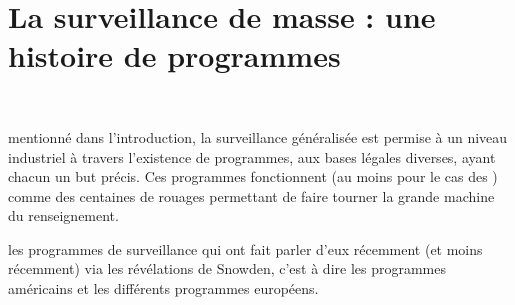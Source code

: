 
\chapter{La surveillance de masse : une histoire de programmes}
\label{ch:programmes}

~\vfill
\begin{doublespace}
\noindent\fontsize{18}{22}\selectfont\itshape
\nohyphenation
{}
\end{doublespace}
\vfill
\vfill

 mentionné dans l'introduction, la surveillance
généralisée est permise à un niveau industriel à travers l'existence de
programmes, aux bases légales diverses, ayant chacun un but précis. Ces
programmes fonctionnent (au moins pour le cas des \EUA) comme des centaines de
rouages permettant de faire tourner la grande machine du renseignement.

 les programmes de surveillance qui ont fait
parler d'eux récemment (et moins récemment) via les révélations de Snowden, c'est à dire les
programmes américains et les différents programmes européens.










